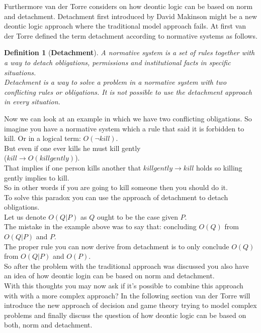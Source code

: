\documentclass[conference]{hehe}
\newtheorem{definition}{Definition}
\begin{document}
Furthermore van der Torre considers on how deontic logic can be based on norm and detachment. Detachment first introduced by David Makinson might be a new deontic logic approach where the traditional model approach fails. At first van der Torre defined the term detachment according to normative systems as follows.\\
\begin{definition}[\textbf{Detachment}]
A normative system is a set of rules together with
a way to detach obligations, permissions and institutional facts in specific situations. \cite{b2}\\
Detachment is a way to solve a problem in a normative system with two conflicting rules or obligations. It is not possible to use the detachment approach in every situation.
\end{definition}

Now we can look at an example in which we have two conflicting obligations. So imagine you have a normative system which a rule that said it is forbidden to kill. Or in a logical term: $O(\lnot kill)$.\\
But even if one ever kills he must kill gently\\
($kill \to O(killgently)$).\\
That implies if one person kills another that $killgently \to kill$ holds so killing gently implies to kill.\\
So in other words if you are going to kill someone then you should do it.\\
To solve this paradox you can use the approach of detachment to detach obligations.\\
Let us denote $O(Q | P)$ as $Q$ ought to be the case given $P$.\\
The mistake in the example above was to say that: concluding $O(Q)$ from $O(Q | P)$ and $P$.\\
The proper rule you can now derive from detachment is to only conclude $O(Q)$ from $O(Q | P)$ and $O(P)$.\\

So after the problem with the traditional approach was discussed you also have an idea of how deontic login can be based on norm and detachment.\\
With this thoughts you may now ask if it's possible to combine this approach with with a more complex approach? In the following section van der Torre will introduce the new approach of decision and game theory trying to model complex problems and finally discuss the question of how deontic logic can be based on both, norm and detachment.
\end{document}
